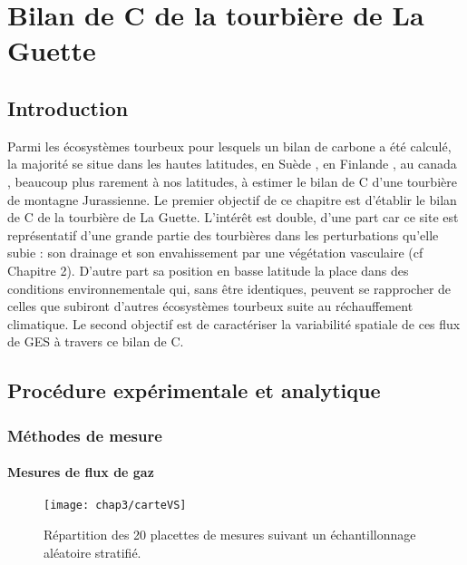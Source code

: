 \chapter{Bilan de C de la tourbière de La Guette}

\minitoc

\newpage

\section{Introduction}

Parmi les écosystèmes tourbeux pour lesquels un bilan de carbone a été calculé, la majorité se situe dans les hautes latitudes, en Suède \citep{waddington2000,peichl2014}, en Finlande \citep{Alm1997}, au canada \citep{trudeau2014}, beaucoup plus rarement à nos latitudes, \citet{bortoluzzi2006} à estimer le bilan de C d'une tourbière de montagne Jurassienne.
Le premier objectif de ce chapitre est d'établir le bilan de C de la tourbière de La Guette.
L'intérêt est double, d'une part car ce site est représentatif d'une grande partie des tourbières dans les perturbations qu'elle subie : son drainage et son envahissement par une végétation vasculaire (cf Chapitre 2).
D'autre part sa position en basse latitude la place dans des conditions environnementale qui, sans être identiques, peuvent se rapprocher de celles que subiront d'autres écosystèmes tourbeux suite au réchauffement climatique.
Le second objectif est de caractériser la variabilité spatiale de ces flux de GES à travers ce bilan de C.

\section{Procédure expérimentale et analytique}

\subsection{Méthodes de mesure}

\subsubsection{Mesures de flux de gaz}

\begin{figure}[t]
\centering
\texttt{[image: chap3/carteVS]}
\caption{Répartition des 20 placettes de mesures suivant un échantillonnage aléatoire stratifié.}
\label{fig:carteVS}
\end{figure}


